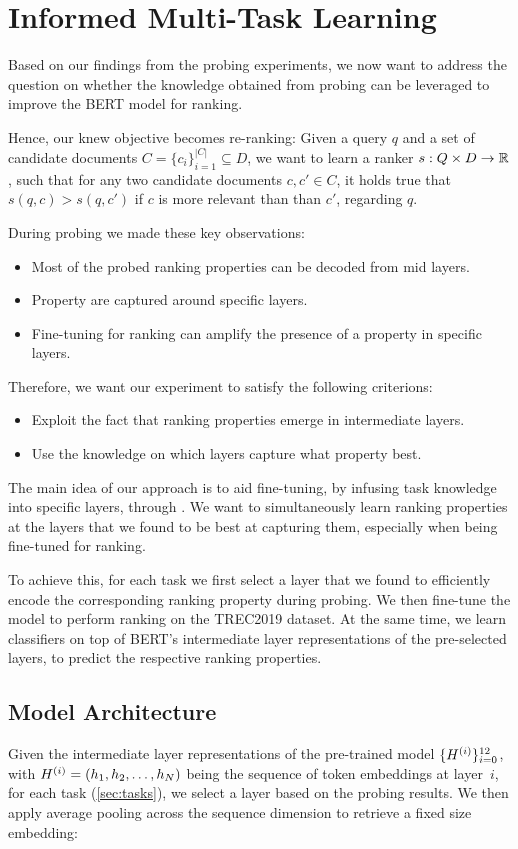 \chapter{Informed Multi-Task Learning}
Based on our findings from the probing experiments, we now want to address the question on whether the knowledge obtained from probing can be leveraged to improve the BERT model for ranking.

Hence, our knew objective becomes re-ranking: Given a query $q$ and a set of candidate documents $C=\{c_i\}_{i=1}^{|C|} \subseteq D$, we want to learn a ranker $s: Q \times D \rightarrow \mathbb{R}$, such that for any two candidate documents $c, c' \in C$, it holds true that $s(q, c) > s(q, c')$ if $c$ is more relevant than than $c'$, regarding $q$.

During probing we made these key observations:

\begin{itemize}
    \item Most of the probed ranking properties can be decoded from mid layers.
    \item Property are captured around specific layers.
    \item Fine-tuning for ranking can amplify the presence of a property in specific layers.
\end{itemize}

Therefore, we want our experiment to satisfy the following criterions:
\begin{itemize}
    \item Exploit the fact that ranking properties emerge in intermediate layers.
    \item Use the knowledge on which layers capture what property best.
\end{itemize}
The main idea of our approach is to aid fine-tuning, by infusing task knowledge into specific layers, through . We want to simultaneously learn ranking properties at the layers that we found to be best at capturing them, especially when being fine-tuned for ranking.

To achieve this, for each task we first select a layer that we found to efficiently encode the corresponding  ranking property during probing. We then fine-tune the  model to perform ranking on the TREC2019 dataset. At the same time, we learn classifiers on top of BERT's intermediate layer representations of the pre-selected layers, to predict the respective ranking properties.

\section{Model Architecture}
Given the intermediate layer representations of the pre-trained  model $\{H^{(i)}\}_{i=0}^{12}$, with $H^{(i)} = (h_1, h_2, \dots, h_{N})$ being the sequence of token embeddings at layer~$i$, for each task (\autoref{sec:tasks}), we select a layer based on the probing results. We then apply average pooling across the sequence dimension to retrieve a fixed size embedding:

